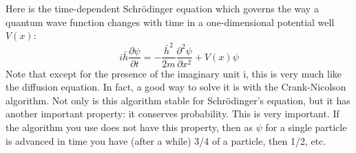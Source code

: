 \documentclass{book}
\theoremstyle{plain}
\theoremstyle{definition}
\numberwithin{exm}{chapter}
\theoremstyle{remark}
\theoremstyle{summary}
\theoremstyle{overview}
\begin{document}
Here is the time-dependent Schr{\"o}dinger equation which governs the way a quantum wave function changes with time in a one-dimensional potential well $V(x)$:
\begin{equation}\label{eq:81}
i \bar{h} \frac{\partial \psi}{\partial t}=-\frac{\bar{h}^{2}}{2 m} \frac{\partial^{2} \psi}{\partial x^{2}}+V(x) \psi
\end{equation}
Note that except for the presence of the imaginary unit i, this is very much like
the diffusion equation. In fact, a good way to solve it is with the Crank-Nicolson
algorithm. Not only is this algorithm stable for Schr{\"o}dinger\rq s equation, but it has
another important property: it conserves probability. This is very important. If
the algorithm you use does not have this property, then as $\psi$ for a single particle
is advanced in time you have (after a while) 3/4 of a particle, then 1/2, etc. \\
\end{document}
